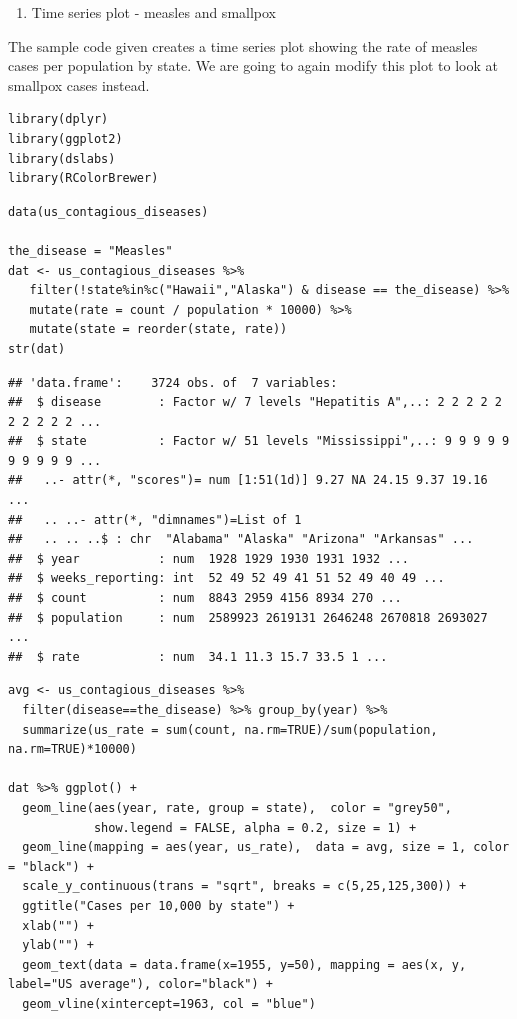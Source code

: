 \documentclass[
]{article}
\providecommand{\tightlist}{%
  \setlength{\itemsep}{0pt}\setlength{\parskip}{0pt}}
\begin{document}
\begin{enumerate}
\def\labelenumi{\arabic{enumi}.}
\setcounter{enumi}{1}
\tightlist
\item
  Time series plot - measles and smallpox
\end{enumerate}

The sample code given creates a time series plot showing the rate of
measles cases per population by state. We are going to again modify this
plot to look at smallpox cases instead.

\begin{verbatim}
library(dplyr)
library(ggplot2)
library(dslabs)
library(RColorBrewer)
\end{verbatim}

\begin{verbatim}
data(us_contagious_diseases)

the_disease = "Measles"
dat <- us_contagious_diseases %>%
   filter(!state%in%c("Hawaii","Alaska") & disease == the_disease) %>%
   mutate(rate = count / population * 10000) %>%
   mutate(state = reorder(state, rate))
str(dat)
\end{verbatim}

\begin{verbatim}
## 'data.frame':    3724 obs. of  7 variables:
##  $ disease        : Factor w/ 7 levels "Hepatitis A",..: 2 2 2 2 2 2 2 2 2 2 ...
##  $ state          : Factor w/ 51 levels "Mississippi",..: 9 9 9 9 9 9 9 9 9 9 ...
##   ..- attr(*, "scores")= num [1:51(1d)] 9.27 NA 24.15 9.37 19.16 ...
##   .. ..- attr(*, "dimnames")=List of 1
##   .. .. ..$ : chr  "Alabama" "Alaska" "Arizona" "Arkansas" ...
##  $ year           : num  1928 1929 1930 1931 1932 ...
##  $ weeks_reporting: int  52 49 52 49 41 51 52 49 40 49 ...
##  $ count          : num  8843 2959 4156 8934 270 ...
##  $ population     : num  2589923 2619131 2646248 2670818 2693027 ...
##  $ rate           : num  34.1 11.3 15.7 33.5 1 ...
\end{verbatim}

\begin{verbatim}
avg <- us_contagious_diseases %>%
  filter(disease==the_disease) %>% group_by(year) %>%
  summarize(us_rate = sum(count, na.rm=TRUE)/sum(population, na.rm=TRUE)*10000)

dat %>% ggplot() +
  geom_line(aes(year, rate, group = state),  color = "grey50", 
            show.legend = FALSE, alpha = 0.2, size = 1) +
  geom_line(mapping = aes(year, us_rate),  data = avg, size = 1, color = "black") +
  scale_y_continuous(trans = "sqrt", breaks = c(5,25,125,300)) + 
  ggtitle("Cases per 10,000 by state") + 
  xlab("") + 
  ylab("") +
  geom_text(data = data.frame(x=1955, y=50), mapping = aes(x, y, label="US average"), color="black") + 
  geom_vline(xintercept=1963, col = "blue")
\end{verbatim}
\end{document}
